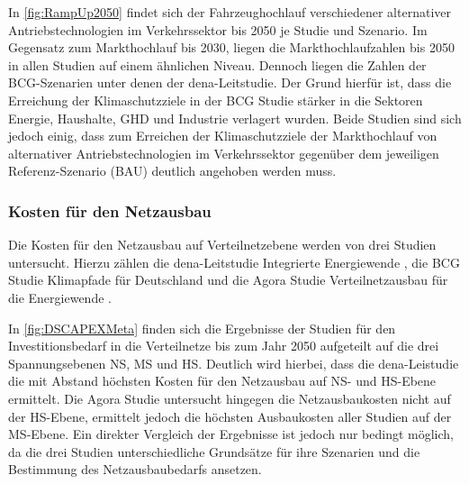 In \autoref{fig:RampUp2050} findet sich der Fahrzeughochlauf verschiedener alternativer Antriebstechnologien im Verkehrssektor bis \num{2050} je Studie und Szenario.
Im Gegensatz zum Markthochlauf bis \num{2030}, liegen die Markthochlaufzahlen bis \num{2050} in allen Studien auf einem ähnlichen Niveau.
Dennoch liegen die Zahlen der BCG-Szenarien unter denen der dena-Leitstudie.
Der Grund hierfür ist, dass die Erreichung der Klimaschutzziele in der BCG Studie stärker in die Sektoren Energie, Haushalte, \gls{GHD} und Industrie verlagert wurden.
Beide Studien sind sich jedoch einig, dass zum Erreichen der Klimaschutzziele der Markthochlauf von alternativer Antriebstechnologien im Verkehrssektor gegenüber dem jeweiligen Referenz-Szenario (\gls{BAU}) deutlich angehoben werden muss.


\subsubsection{Kosten für den Netzausbau}

Die Kosten für den Netzausbau auf Verteilnetzebene werden von drei Studien untersucht.
Hierzu zählen die dena-Leitstudie \glqq Integrierte Energiewende\grqq{} \cite{DEAGH2018}, die BCG Studie \glqq Klimapfade für Deutschland\grqq{} \cite{BCG2018} und die Agora Studie \glqq Verteilnetzausbau für die Energiewende\grqq{} \cite{Agora2019}.



In \autoref{fig:DSCAPEXMeta} finden sich die Ergebnisse der Studien für den Investitionsbedarf in die Verteilnetze bis zum Jahr \num{2050} aufgeteilt auf die drei Spannungsebenen \gls{NS}, \gls{MS} und \gls{HS}.
Deutlich wird hierbei, dass die dena-Leistudie die mit Abstand höchsten Kosten für den Netzausbau auf \gls{NS}- und \gls{HS}-Ebene ermittelt.
Die Agora Studie untersucht hingegen die Netzausbaukosten nicht auf der \gls{HS}-Ebene, ermittelt jedoch die höchsten Ausbaukosten aller Studien auf der \gls{MS}-Ebene.
Ein direkter Vergleich der Ergebnisse ist jedoch nur bedingt möglich, da die drei Studien unterschiedliche Grundsätze für ihre Szenarien und die Bestimmung des Netzausbaubedarfs ansetzen.\medskip

